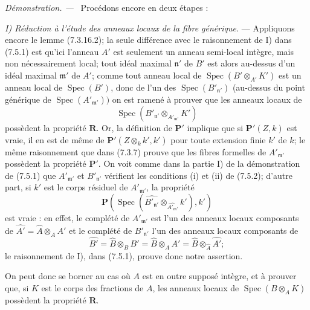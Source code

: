 \documentclass[10pt,oneside]{book}
\newenvironment{proof}{%
  \par\medskip\noindent\textit{Démonstration. ---\ }}{\par}
\begin{document}
\begin{proof}
Procédons encore en deux étapes :

\emph{I) Réduction à l'étude des anneaux locaux de la fibre générique.} ---
Appliquons encore le lemme (7.3.16.2); la seule différence avec le
raisonnement de I) dans (7.5.1) est qu'ici l'anneau $A'$ est seulement un
anneau semi-local intègre, mais non nécessairement local; tout idéal maximal
$\mathfrak n'$ de $B'$ est alors au-dessus d'un idéal maximal $\mathfrak m'$
de $A'$; comme tout anneau local de
$\operatorname{Spec}(B'\otimes_{A'}K')$ est un anneau local de
$\operatorname{Spec}(B')$, donc de l'un des
$\operatorname{Spec}(B'_{\mathfrak n'})$ (au-dessus du point générique de
$\operatorname{Spec}(A'_{\mathfrak m'}))$ on est ramené à prouver que les
anneaux locaux de
\[
\operatorname{Spec}(B'_{\mathfrak n'}
\otimes_{A'_{\mathfrak m'}}K')
\]
possèdent la propriété $\boldsymbol R$. Or, la définition de
$\boldsymbol P'$ implique que si $\boldsymbol P'(Z,k)$ est vraie, il en est
de même de $\boldsymbol P'(Z\otimes_k k',k')$ pour toute extension finie
$k'$ de $k$; le même raisonnement que dans (7.3.7) prouve que les fibres
formelles de $A'_{\mathfrak m'}$ possèdent la propriété $\boldsymbol P'$.
On voit comme dans la partie I) de la démonstration de (7.5.1) que
$A'_{\mathfrak m'}$ et $B'_{\mathfrak n'}$ vérifient les conditions (i) et
(ii) de (7.5.2); d'autre part, si $k'$ est le corps résiduel de
$A'_{\mathfrak m'}$, la propriété
\[
\boldsymbol P(\operatorname{Spec}(\widehat{B'_{\mathfrak n'}}
\otimes_{\widehat{A'_{\mathfrak m'}}}k'),k')
\]
est vraie : en effet, le complété de $A'_{\mathfrak m'}$ est l'un des
anneaux locaux composants de
$\widehat{A'}=\widehat A\otimes_A A'$ et le complété de
$B'_{\mathfrak n'}$ l'un des anneaux locaux composants de
\[
\widehat{B'}=\widehat B\otimes_B B'
=\widehat B\otimes_A A'
=\widehat B\otimes_{\widehat A}\widehat{A'};
\]
le raisonnement de I), dans (7.5.1), prouve donc notre assertion.

On peut donc se borner au cas où $A$ est en outre supposé intègre, et à
prouver que, si $K$ est le corps des fractions de $A$, les anneaux locaux de
$\operatorname{Spec}(B\otimes_A K)$ possèdent la propriété
$\boldsymbol R$.


\end{proof}
\end{document}
